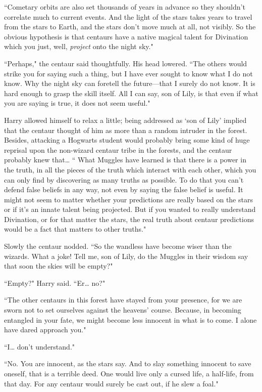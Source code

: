 ``Cometary orbits are also set thousands of years in advance so they shouldn't correlate much to current events. And the light of the stars takes years to travel from the stars to Earth, and the stars don't move much at all, not visibly. So the obvious hypothesis is that centaurs have a native magical talent for Divination which you just, well, \emph{project} onto the night sky."

``Perhaps," the centaur said thoughtfully. His head lowered. ``The others would strike you for saying such a thing, but I have ever sought to know what I do not know. Why the night sky can foretell the future---that I surely do not know. It is hard enough to grasp the skill itself. All I can say, son of Lily, is that even if what you are saying is true, it does not seem useful."

Harry allowed himself to relax a little; being addressed as `son of Lily' implied that the centaur thought of him as more than a random intruder in the forest. Besides, attacking a Hogwarts student would probably bring some kind of huge reprisal upon the non-wizard centaur tribe in the forests, and the centaur probably knew that{\ldots} `` What Muggles have learned is that there is a power in the truth, in all the pieces of the truth which interact with each other, which you can only find by discovering as many truths as possible. To do that you can't defend false beliefs in any way, not even by saying the false belief is useful. It might not seem to matter whether your predictions are really based on the stars or if it's an innate talent being projected. But if you wanted to really understand Divination, or for that matter the stars, the real truth about centaur predictions would be a fact that matters to other truths."

Slowly the centaur nodded. ``So the wandless have become wiser than the wizards. What a joke! Tell me, son of Lily, do the Muggles in their wisdom say that soon the skies will be empty?"

``Empty?" Harry said. ``Er{\ldots} no?"

``The other centaurs in this forest have stayed from your presence, for we are sworn not to set ourselves against the heavens' course. Because, in becoming entangled in your fate, we might become less innocent in what is to come. I alone have dared approach you."

``I{\ldots} don't understand."

``No. You are innocent, as the stars say. And to slay something innocent to save oneself, that is a terrible deed. One would live only a cursed life, a half-life, from that day. For any centaur would surely be cast out, if he slew a foal."

